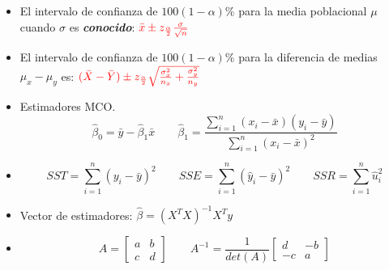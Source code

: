 \documentclass[10pt,a4paper]{article}
\begin{document}
\begin{itemize}

\item El intervalo de confianza de $100(1-\alpha)\%$ para la media poblacional $\mu$ cuando $\sigma$ es \emph{\textbf{conocido}}:
$\color{red}{\bar{x} \pm z_{\frac{\alpha}{2}}\frac{\sigma}{\sqrt{n}}}$

\item El intervalo de confianza de $100(1-\alpha)\%$ para la diferencia de medias
$\mu_x-\mu_y$ es:
${\color{red}(\bar{X}-\bar{Y}) \pm z_{\frac{\alpha}{2}}\sqrt{\frac{\sigma_x^2}{n_x}+\frac{\sigma_y^2}{n_y}}}$

\item  Estimadores MCO.
{\color{red}
$$\hat{\beta}_0 = \bar{y} - \hat{\beta}_1 \bar{x} \quad \quad   \hat{\beta}_1 = \frac{\sum_{i=1}^{n}(x_i - \bar{x})(y_i-\bar{y})}{\sum_{i=1}^{n}(x_i - \bar{x})^2}$$}
    
\item 
	{\color{red}	\[ SST = \sum_{i=1}^{n} (y_i - \bar{y})^2 \quad \quad  SSE = \sum_{i=1}^{n} (\hat{y}_i - \bar{y})^2 \quad \quad SSR = \sum_{i=1}^{n} \hat{u}_i^2  \]}
		
		
    \item Vector de estimadores:    
{\color{red}    $\hat{\beta}=(X^TX)^{-1}X^Ty$}

\item {\color{red}\[
A = \begin{bmatrix}
a & b \\
c & d
\end{bmatrix}
\qquad
A^{-1} = \frac{1}{det(A)} \begin{bmatrix}
d & -b \\
-c & a
\end{bmatrix}
\]}
\end{itemize}
\end{document}
